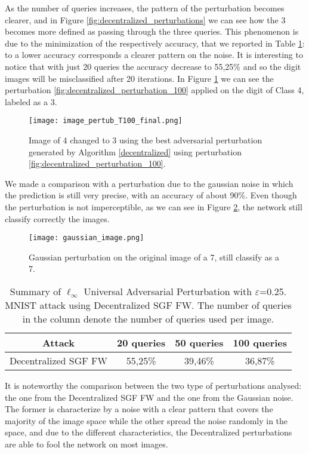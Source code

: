As the number of queries increases, the pattern of the perturbation becomes clearer, and in Figure \ref{fig:decentralized_perturbations} we can see how the 3 becomes more defined as passing through the three queries. This phenomenon is due to the minimization of the respectively accuracy, that we reported in Table \ref{tab:decentralized}: to a lower accuracy corresponds a clearer pattern on the noise. It is interesting to notice that with just 20 queries the accuracy decrease to 55,25\% and so the digit images will be misclassified after 20 iterations. In Figure \ref{fig:decentralized} we can see the perturbation \ref{fig:decentralized_perturbation_100} applied on the digit of Class 4, labeled as a 3.

\begin{figure}[htbp]
	\centering
	\texttt{[image: image\_pertub\_T100\_final.png]}
	\caption{Image of 4 changed to 3 using the best adversarial perturbation generated by Algorithm \ref{decentralized} using perturbation \ref{fig:decentralized_perturbation_100}.}
	\label{fig:decentralized}
\end{figure}

We made a comparison with a perturbation due to the gaussian noise in which the prediction is still very precise, with an accuracy of about 90\%. Even though the perturbation is not imperceptible, as we can see in Figure \ref{fig:gaussian_noise}, the network still classify correctly the images.

\begin{figure}[htbp]
	\centering
	\texttt{[image: gaussian\_image.png]}
	\caption{Gaussian perturbation on the original image of a 7, still classify as a 7.}
	\label{fig:gaussian_noise}
\end{figure}

\begin{table}[htbp]
	\begin{center}
		\begin{adjustwidth}{-.6cm}{}
			\begin{tabular}{cccc}
				\textbf{Attack} &          20 \textbf{queries} &      50 \textbf{queries} &     100 \textbf{queries} \\
				\midrule
				{\small Decentralized SGF FW}     &    55,25\% &    39,46\% &       36,87\% \\
			\end{tabular}
		\end{adjustwidth}
	\end{center}
	\caption{{\small Summary of $\ell_\infty$ Universal Adversarial Perturbation with $\varepsilon$=0.25. MNIST attack using Decentralized SGF FW. The number of queries in the column denote the number of queries used per image.}}
	\label{tab:decentralized}
\end{table}

It is noteworthy the comparison between the two type of perturbations analysed: the one from the Decentralized SGF FW and the one from the Gaussian noise. The former is characterize by a noise with a clear pattern that covers the majority of the image space while the other spread the noise randomly in the space, and due to the different characteristics, the Decentralized perturbations are able to fool the network on most images.